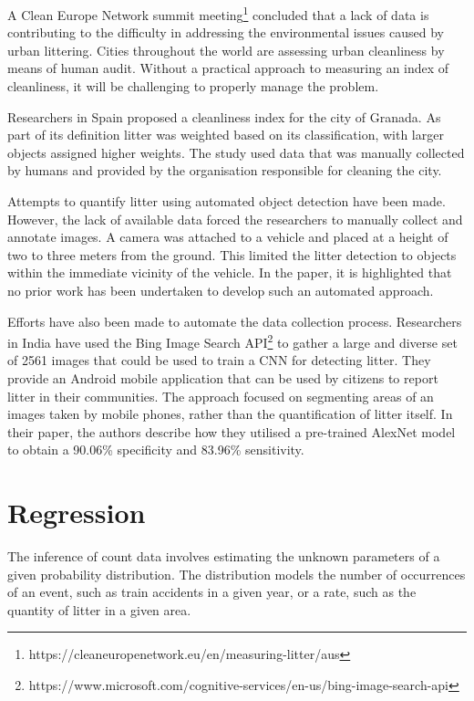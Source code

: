 \documentclass{thesis}
\begin{document}
A Clean Europe Network summit meeting\footnote{https://cleaneuropenetwork.eu/en/measuring-litter/aus} concluded that a lack of data is contributing to the difficulty in addressing the environmental issues caused by urban littering. Cities throughout the world are assessing urban cleanliness by means of human audit. Without a practical approach to measuring an index of cleanliness, it will be challenging to properly manage the problem. 

Researchers in Spain proposed a cleanliness index for the city of Granada\cite{sevilla}. As part of its definition litter was weighted based on its classification, with larger objects assigned higher weights. The study used data that was manually collected by humans and provided by the organisation responsible for cleaning the city.

Attempts to quantify litter using automated object detection have been made\cite{cvstreets}. However, the lack of available data forced the researchers to manually collect and annotate images. A camera was attached to a vehicle and placed at a height of two to three meters from the ground. This limited the litter detection to objects within the immediate vicinity of the vehicle. In the paper, it is highlighted that no prior work has been undertaken to develop such an automated approach.

Efforts have also been made to automate the data collection process. Researchers in India have used the Bing Image Search API\footnote{https://www.microsoft.com/cognitive-services/en-us/bing-image-search-api} to gather a large and diverse set of 2561 images that could be used to train a CNN for detecting litter\cite{Mittal2016SpotGarbageSA}. They provide an Android mobile application that can be used by citizens to report litter in their communities. The approach focused on segmenting areas of an images taken by mobile phones, rather than the quantification of litter itself. In their paper, the authors describe how they utilised a pre-trained AlexNet\cite{NIPS2012_c399862d} model to obtain a 90.06\% specificity and 83.96\% sensitivity.

\section{Regression}

The inference of count data involves estimating the unknown parameters of a given probability distribution. The distribution models the number of occurrences of an event, such as train accidents in a given year, or a rate, such as the quantity of litter in a given area.
\end{document}
